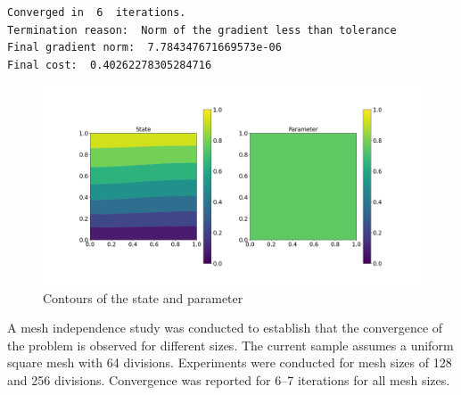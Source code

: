 \begin{itemize}
\begin{lstlisting}[language=bash]
Converged in  6  iterations.
Termination reason:  Norm of the gradient less than tolerance
Final gradient norm:  7.784347671669573e-06
Final cost:  0.40262278305284716
    \end{lstlisting}
    \begin{figure}[th]
        \centering
        \includegraphics[width=1.0\textwidth]{figures/space.png}
        \caption{Contours of the state and parameter}
        \label{figure:space}
    \end{figure}
    A mesh independence study was conducted to establish that the convergence of the problem is observed for different sizes. The current sample assumes a uniform square mesh with 64 divisions. Experiments were conducted for mesh sizes of 128 and 256 divisions. Convergence was reported for 6--7 iterations for all mesh sizes. 
\end{itemize}